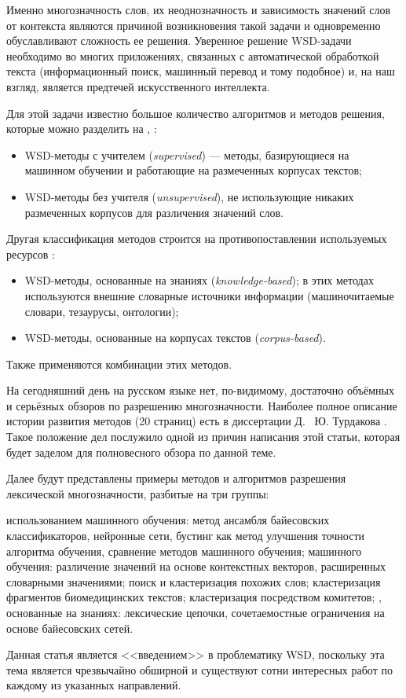 \documentclass{article}
\begin{document}
\begin{articletext}
Именно многозначность слов, их неоднозначность и зависимость значений слов от контекста являются причиной возникновения такой задачи и одновременно обуславливают сложность ее решения. Уверенное решение WSD-задачи необходимо во многих приложениях, связанных с автоматической обработкой текста (информационный поиск, машинный перевод и тому подобное) и, на наш взгляд, является предтечей искусственного интеллекта.

Для этой задачи известно большое количество алгоритмов и методов решения, которые можно разделить на \cite{Lukash 2011}, \cite{Navigli 2009}: 

\begin{itemize}
\item WSD-методы с учителем (\textit{supervised}) --- методы, базирующиеся на машинном обучении и работающие на размеченных корпусах текстов; 
\item WSD-методы без учителя (\textit{unsupervised}), не использующие никаких размеченных корпусов для различения значений слов.
\end{itemize}

Другая классификация методов строится на противопоставлении используемых ресурсов \cite{Navigli 2009}:
\begin{itemize}
\item WSD-методы, основанные на знаниях (\textit{knowledge-based}); в этих методах используются внешние словарные источники информации (машиночитаемые словари, тезаурусы, онтологии);
\item WSD-методы, основанные на корпусах текстов (\textit{corpus-based}).
\end{itemize}

Также применяются комбинации этих методов.

На сегодняшний день на русском языке нет, по-видимому, достаточно объёмных и серьёзных обзоров по разрешению многозначности. Наиболее полное описание истории развития методов (20 страниц) есть в диссертации Д.~ Ю. Турдакова \cite{Trudakov 2010}. Такое положение дел послужило одной из причин написания этой статьи, которая будет заделом для полновесного обзора по данной теме.

Далее будут представлены примеры методов и алгоритмов разрешения лексической многозначности, разбитые на три группы: 
\begin{itemize}
 использованием машинного обучения: метод ансамбля байесовских классификаторов, нейронные сети, бустинг как метод улучшения точности алгоритма обучения, сравнение методов машинного обучения;
 машинного обучения: различение значений на основе контекстных векторов, расширенных словарными значениями; поиск и кластеризация похожих слов; кластеризация фрагментов биомедицинских текстов; кластеризация посредством комитетов;
, основанные на знаниях: лексические цепочки, сочетаемостные ограничения на основе байесовских сетей.
\end{itemize}
 Данная статья является <<введением>> в проблематику WSD, поскольку эта тема является чрезвычайно обширной и существуют сотни интересных работ по каждому из указанных направлений.


\end{articletext}
\end{document}
